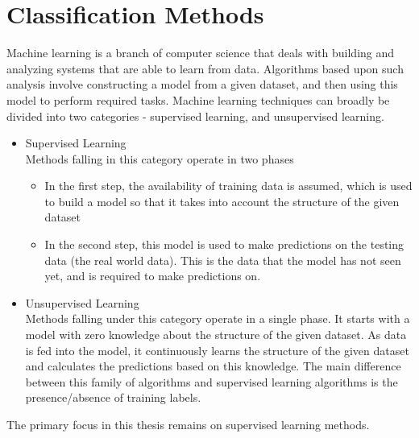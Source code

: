 \chapter{Classification Methods}
\label{chapter:Classification Methods}

Machine learning is a branch of computer science that deals with building and analyzing systems that are able to learn from data. Algorithms based upon such analysis involve constructing a model from a given dataset, and then using this model to perform required tasks. Machine learning techniques can broadly be divided into two categories - supervised learning, and unsupervised learning.
\begin{itemize}
    \item{
    Supervised Learning\\
    Methods falling in this category operate in two phases
    \begin{itemize}
        \item{In the first step, the availability of training data is assumed, which is used to build a model so that it takes into account the structure of the given dataset}
        \item{In the second step, this model is used to make predictions on the testing data (the real world data). This is the data that the model has not seen yet, and is required to make predictions on.}
    \end{itemize}
    }
    \item{
    Unsupervised Learning\\
    Methods falling under this category operate in a single phase. It starts with a model with zero knowledge about the structure of the given dataset. As data is fed into the model, it continuously learns the structure of the given dataset and calculates the predictions based on this knowledge. The main difference between this family of algorithms and supervised learning algorithms is the presence/absence of training labels.
    }
\end{itemize}
The primary focus in this thesis remains on supervised learning methods.

